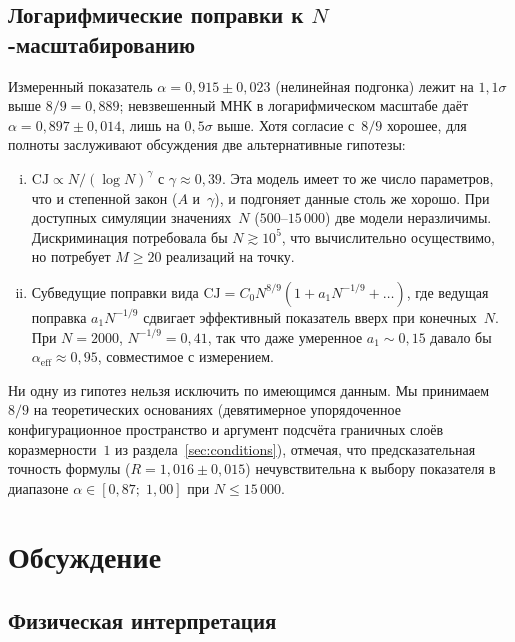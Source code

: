 \documentclass[12pt,a4paper]{article}
\theoremstyle{plain}
\theoremstyle{definition}
\theoremstyle{remark}
\newcommand{\CJ}{\mathrm{CJ}}
\begin{document}
\subsection{Логарифмические поправки к $N$-масштабированию}
\label{sec:logcorr}

Измеренный показатель $\alpha = 0{,}915 \pm 0{,}023$
(нелинейная подгонка) лежит на $1{,}1\sigma$ выше
$8/9 = 0{,}889$; невзвешенный МНК в логарифмическом
масштабе даёт $\alpha = 0{,}897 \pm 0{,}014$, лишь на
$0{,}5\sigma$ выше.  Хотя согласие с~$8/9$ хорошее, для
полноты заслуживают обсуждения две альтернативные гипотезы:
\begin{enumerate}[(i)]
\item $\CJ \propto N / (\log N)^\gamma$ с
  $\gamma \approx 0{,}39$.  Эта модель имеет то же число
  параметров, что и степенной закон ($A$ и~$\gamma$), и
  подгоняет данные столь же хорошо.  При доступных
  симуляции значениях~$N$ ($500$--$15\,000$) две модели
  неразличимы.  Дискриминация потребовала бы
  $N \gtrsim 10^5$, что вычислительно осуществимо, но
  потребует $M \geq 20$ реализаций на точку.
\item Субведущие поправки вида
  $\CJ = C_0 N^{8/9}(1 + a_1 N^{-1/9} + \ldots)$, где
  ведущая поправка $a_1 N^{-1/9}$ сдвигает эффективный
  показатель вверх при конечных~$N$.  При $N = 2000$,
  $N^{-1/9} = 0{,}41$, так что даже умеренное
  $a_1 \sim 0{,}15$ давало бы
  $\alpha_{\mathrm{eff}} \approx 0{,}95$, совместимое с
  измерением.
\end{enumerate}
Ни одну из гипотез нельзя исключить по имеющимся данным.
Мы принимаем $8/9$ на теоретических основаниях
(девятимерное упорядоченное конфигурационное пространство
и аргумент подсчёта граничных слоёв коразмерности~$1$ из
раздела~\ref{sec:conditions}), отмечая, что предсказательная
точность формулы ($R = 1{,}016 \pm 0{,}015$) нечувствительна
к выбору показателя в диапазоне
$\alpha \in [0{,}87;\; 1{,}00]$ при $N \leq 15\,000$.

\section{Обсуждение}
\label{sec:discussion}

\subsection{Физическая интерпретация}
\end{document}
